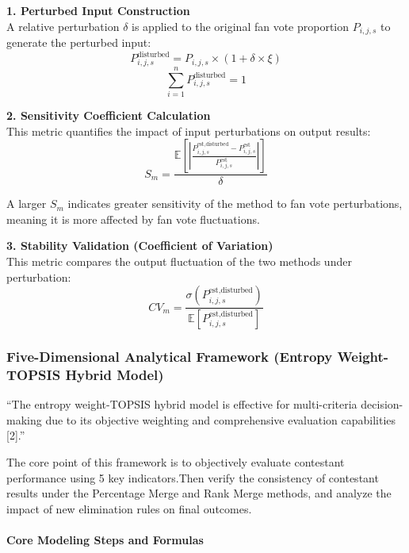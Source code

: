 \documentclass{mcmthesis}
\begin{document}
\noindent\textbf{1. Perturbed Input Construction}\hfill\\
A relative perturbation $\delta$ is applied to the original fan vote proportion $P_{i,j,s}$ to generate the perturbed input:
\begin{equation}
P_{i,j,s}^\text{disturbed} = P_{i,j,s} \times (1 + \delta \times \xi)
\end{equation}
$$
\sum_{i=1}^n P_{i,j,s}^\text{disturbed} = 1
$$

\noindent\textbf{2. Sensitivity Coefficient Calculation}\hfill\\
This metric quantifies the impact of input perturbations on output results:
\begin{equation}
S_m = \frac{\mathbb{E}\left[\left|\frac{P_{i,j,s}^\text{est,disturbed} - P_{i,j,s}^\text{est}}{P_{i,j,s}^\text{est}}\right|\right]}{\delta}
\end{equation}

A larger $S_m$ indicates greater sensitivity of the method to fan vote perturbations, meaning it is more affected by fan vote fluctuations.

\noindent\textbf{3. Stability Validation (Coefficient of Variation)}\hfill\\
This metric compares the output fluctuation of the two methods under perturbation:
\begin{equation}
CV_m = \frac{\sigma(P_{i,j,s}^\text{est,disturbed})}{\mathbb{E}[P_{i,j,s}^\text{est,disturbed}]}
\end{equation}


\subsubsection{Five-Dimensional Analytical Framework (Entropy Weight-TOPSIS Hybrid Model)}
“The entropy weight-TOPSIS hybrid model is effective for multi-criteria decision-making due to its objective weighting and comprehensive evaluation capabilities [2].”

The core point of this framework is to objectively evaluate contestant performance using 5 key indicators.Then verify the consistency of contestant results under the Percentage Merge and Rank Merge methods, and analyze the impact of new elimination rules on final outcomes.

\paragraph{Core Modeling Steps and Formulas}\hfill\\
\end{document}

